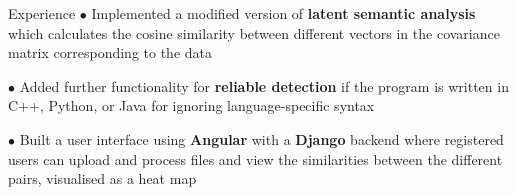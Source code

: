 \begin{rubric}{Experience}
	    $\bullet$ Implemented a modified version of \textbf{latent semantic analysis} which calculates the cosine similarity between different vectors in the covariance matrix corresponding to the data
        
        $\bullet$ Added further functionality for \textbf{reliable detection} if the program is written in C++, Python, or Java for ignoring language-specific syntax

        $\bullet$ Built a user interface using \textbf{Angular} with a \textbf{Django} backend where registered users can upload and process files and view the similarities between the different pairs, visualised as a heat map

        



        
        
\end{rubric}